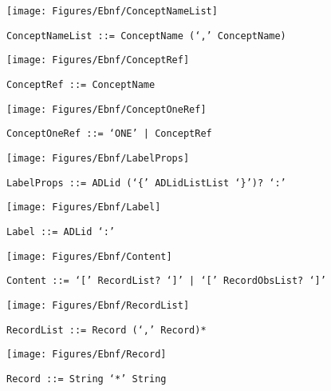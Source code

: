  \begin{figure}[H]
  \centering
  \texttt{[image: Figures/Ebnf/ConceptNameList]}
  \caption*{\texttt{ConceptNameList \small::=  ConceptName (`,' ConceptName)}}
  \label{fig:ebnf-ConceptNameList}
 \end{figure}

 \begin{figure}[H]
  \centering
  \texttt{[image: Figures/Ebnf/ConceptRef]}
  \caption*{\texttt{ConceptRef \small::=  ConceptName}}
  \label{fig:ebnf-ConceptRef}
 \end{figure}

 \begin{figure}[H]
  \centering
  \texttt{[image: Figures/Ebnf/ConceptOneRef]}
  \caption*{\texttt{ConceptOneRef \small::=  `ONE' | ConceptRef}}
  \label{fig:ebnf-ConceptOneRef}
 \end{figure}

 \begin{figure}[H]
  \centering
  \texttt{[image: Figures/Ebnf/LabelProps]}
  \caption*{\texttt{LabelProps \small::=  ADLid (`\{' ADLidListList `\}')? `:'}}
  \label{fig:ebnf-LabelProps}
 \end{figure}

 \begin{figure}[H]
  \centering
  \texttt{[image: Figures/Ebnf/Label]}
  \caption*{\texttt{Label \small::=  ADLid `:'}}
  \label{fig:ebnf-Label}
 \end{figure}

 \begin{figure}[H]
  \centering
  \texttt{[image: Figures/Ebnf/Content]}
  \caption*{\texttt{Content \small::=  `[' RecordList? `]' | `[' RecordObsList? `]'}}
  \label{fig:ebnf-Content}
 \end{figure}

 \begin{figure}[H]
  \centering
  \texttt{[image: Figures/Ebnf/RecordList]}
  \caption*{\texttt{RecordList \small::=  Record (`,' Record)*}}
  \label{fig:ebnf-RecordList}
 \end{figure}

 \begin{figure}[H]
  \centering
  \texttt{[image: Figures/Ebnf/Record]}
  \caption*{\texttt{Record \small::=  String `*' String}}
  \label{fig:ebnf-Record}
 \end{figure}


